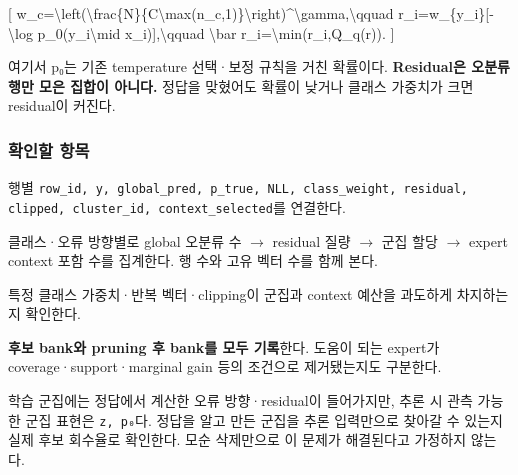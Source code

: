[ w\_\allowbreak{}c=\allowbreak{}\textbackslash{}left(\textbackslash{}frac\{N\}\{C\textbackslash{}max(n\_\allowbreak{}c,1)\}\textbackslash{}right)\textasciicircum{}\textbackslash{}gamma,\textbackslash{}qquad r\_\allowbreak{}i=\allowbreak{}w\_\allowbreak{}\{y\_\allowbreak{}i\}[-\textbackslash{}log p\_\allowbreak{}0(y\_\allowbreak{}i\textbackslash{}mid x\_\allowbreak{}i)],\textbackslash{}qquad \textbackslash{}bar r\_\allowbreak{}i=\allowbreak{}\textbackslash{}min(r\_\allowbreak{}i,Q\_\allowbreak{}q(r)). ]

여기서 p₀는 기존 temperature 선택·보정 규칙을 거친 확률이다. \textbf{Residual은 오분류 행만 모은 집합이 아니다.} 정답을 맞혔어도 확률이 낮거나 클래스 가중치가 크면 residual이 커진다.

\subsubsection{확인할 항목}
\par\noindent \textbullet\enspace 행별 \texttt{row\_\allowbreak{}\allowbreak{}id,\allowbreak{} \allowbreak{}y,\allowbreak{} globa\allowbreak{}l\_\allowbreak{}\allowbreak{}pred,\allowbreak{} \allowbreak{}p\_\allowbreak{}\allowbreak{}true,\allowbreak{} \allowbreak{}NLL,\allowbreak{} cla\allowbreak{}ss\_\allowbreak{}\allowbreak{}weigh\allowbreak{}t,\allowbreak{} resid\allowbreak{}ual,\allowbreak{} cli\allowbreak{}pped,\allowbreak{} cl\allowbreak{}uster\_\allowbreak{}\allowbreak{}id\allowbreak{},\allowbreak{} contex\allowbreak{}t\_\allowbreak{}\allowbreak{}select\allowbreak{}ed}를 연결한다.


\par\noindent \textbullet\enspace 클래스·오류 방향별로 global 오분류 수  \ensuremath{\rightarrow}  residual 질량  \ensuremath{\rightarrow}  군집 할당  \ensuremath{\rightarrow}  expert context 포함 수를 집계한다. 행 수와 고유 벡터 수를 함께 본다.


\par\noindent \textbullet\enspace 특정 클래스 가중치·반복 벡터·clipping이 군집과 context 예산을 과도하게 차지하는지 확인한다.


\par\noindent \textbullet\enspace \textbf{후보 bank와 pruning 후 bank를 모두 기록}한다. 도움이 되는 expert가 coverage·support·marginal gain 등의 조건으로 제거됐는지도 구분한다.


\par\noindent \textbullet\enspace 학습 군집에는 정답에서 계산한 오류 방향·residual이 들어가지만, 추론 시 관측 가능한 군집 표현은 \texttt{z,\allowbreak{} p₀}다. 정답을 알고 만든 군집을 추론 입력만으로 찾아갈 수 있는지 실제 후보 회수율로 확인한다. 모순 삭제만으로 이 문제가 해결된다고 가정하지 않는다.


